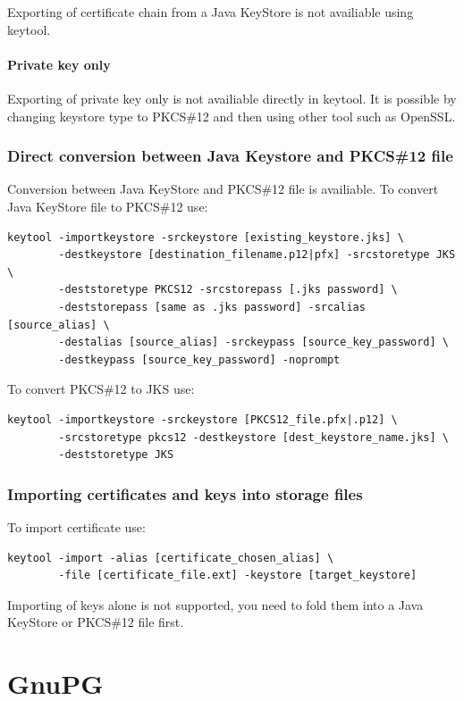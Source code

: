 \documentclass[10pt, a4paper]{report}
\begin{document}
Exporting of certificate chain from a Java KeyStore is not availiable using keytool.

    \subsubsection{Private key only}
Exporting of private key only is not availiable directly in keytool. It is possible by changing keystore type to PKCS\#12 and then using other tool such as OpenSSL.

  \subsection{Direct conversion between Java Keystore and PKCS\#12 file}
Conversion between Java KeyStore and PKCS\#12 file is availiable. To convert Java KeyStore file to PKCS\#12 use:
\begin{verbatim}
keytool -importkeystore -srckeystore [existing_keystore.jks] \
        -destkeystore [destination_filename.p12|pfx] -srcstoretype JKS \
        -deststoretype PKCS12 -srcstorepass [.jks password] \
        -deststorepass [same as .jks password] -srcalias [source_alias] \
        -destalias [source_alias] -srckeypass [source_key_password] \
        -destkeypass [source_key_password] -noprompt
\end{verbatim}

To convert PKCS\#12 to JKS use:
\begin{verbatim}
keytool -importkeystore -srckeystore [PKCS12_file.pfx|.p12] \
        -srcstoretype pkcs12 -destkeystore [dest_keystore_name.jks] \
        -deststoretype JKS
\end{verbatim}

  
  \subsection{Importing certificates and keys into storage files}
To import certificate use:
\begin{verbatim}
keytool -import -alias [certificate_chosen_alias] \
        -file [certificate_file.ext] -keystore [target_keystore]  
\end{verbatim}

Importing of keys alone is not supported, you need to fold them into a Java KeyStore or PKCS\#12 file first.



\chapter{GnuPG}
\end{document}
